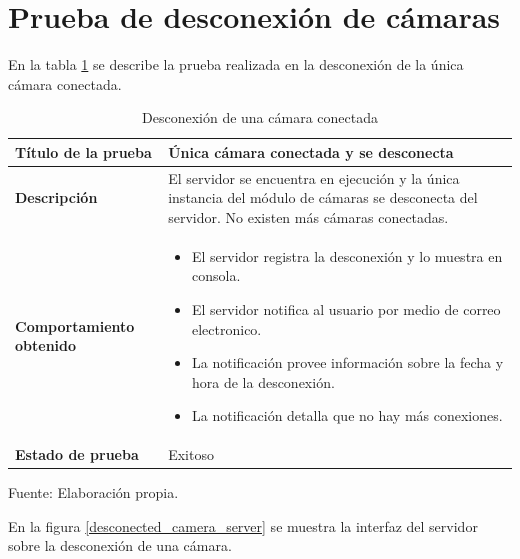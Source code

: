 \section{Prueba de desconexión de cámaras}

En la tabla \ref{desconected_camera} se describe la prueba realizada en la desconexión de la única cámara conectada.

\begin{table}[H]
    \caption{Desconexión de una cámara conectada}
    \begin{center}
        \begin{tabular}{|>{\centering}p{}|m{}<{\centering}|} 
            \hline
            \textbf{Título de la prueba} & \textbf{Única cámara conectada y se desconecta} \\
            \hline
            \textbf{Descripción} & El servidor se encuentra en ejecución y la única instancia del módulo de cámaras se desconecta del servidor. No existen más cámaras conectadas.\\
            \hline
            \textbf{Comportamiento obtenido} & 
            \begin{itemize}
                \item El servidor registra la desconexión y lo muestra en consola.
                \item El servidor notifica al usuario por medio de correo electronico.
                \item La notificación provee información sobre la fecha y hora de la desconexión.
                \item La notificación detalla que no hay más conexiones.
            \end{itemize} \\ 
            \hline
            \textbf{Estado de prueba} & Exitoso \\
            \hline
        \end{tabular}
    \end{center}
    \begin{center}
        Fuente: Elaboración propia.
        \label{desconected_camera}
    \end{center}
\end{table}

En la figura \ref{desconected_camera_server} se muestra la interfaz del servidor sobre la desconexión de una cámara.

